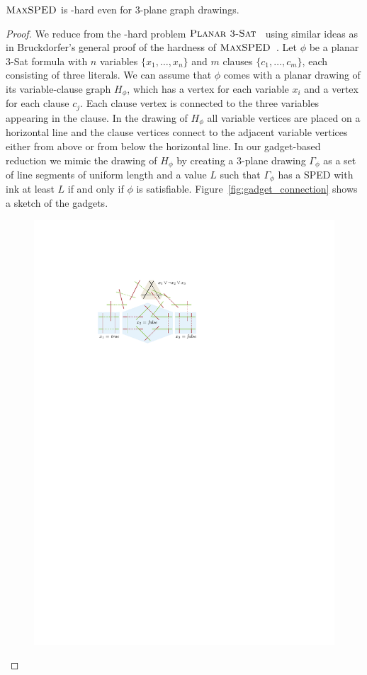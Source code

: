 \documentclass[a4paper, USenglish]{llncs}
\newcommand{\maxsped}{\ensuremath{\textsc{MaxSPED}}\xspace}
\newcommand{\ppsat}{\ensuremath{\textsc{Planar 3-Sat}}\xspace}
\begin{document}
	\begin{theorem}\label{thm:hard}
		\maxsped is \NP-hard even for 3-plane graph drawings.
	\end{theorem}
	\begin{proof}
		We reduce from the \NP-hard problem \ppsat~\cite{l-pftu-82} using similar ideas as in Bruckdorfer's general proof of the hardness of \maxsped~\cite{b-sgh-15}. 
		Let $\phi$ be a planar 3-Sat formula with $n$ variables $\{x_1, \dots, x_n\}$ and $m$ clauses $\{c_1, \dots, c_m\}$, each consisting of three literals.
		We can assume that $\phi$ comes with a planar drawing of its variable-clause graph $H_\phi$, which has a vertex for each variable $x_i$ and a vertex for each clause $c_j$.
		Each clause vertex is connected to the three variables appearing in the clause.
		In the drawing of $H_\phi$ all variable vertices are placed on a horizontal line and the clause vertices connect to the adjacent variable vertices either from above or from below the horizontal line.
		In our gadget-based reduction we mimic the drawing of $H_\phi$ by creating a 3-plane drawing $\Gamma_\phi$ as a set of line segments of uniform length and a value $L$ such that $\Gamma_\phi$ has a SPED with ink at least $L$ if and only if $\phi$ is satisfiable.
		Figure~\ref{fig:gadget_connection} shows a sketch of the gadgets.
		\begin{figure}
			\centering
			\includegraphics{figures/Reduction_visual}

\end{figure}
\end{proof}
\end{document}
